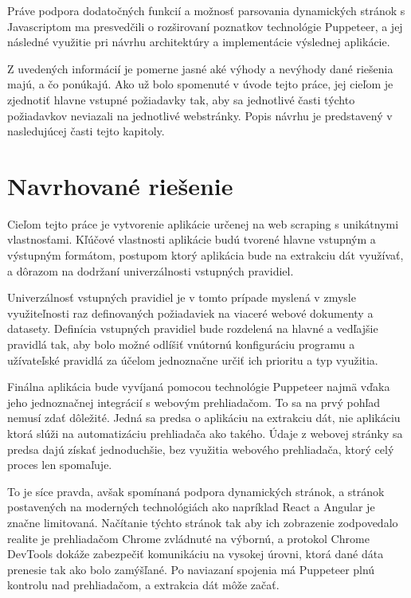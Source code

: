 Práve podpora dodatočných funkcií a možnosť parsovania dynamických stránok s Javascriptom ma presvedčili o rozširovaní poznatkov technológie Puppeteer, a jej následné využitie pri návrhu architektúry a implementácie výslednej aplikácie. 

\bigskip

Z uvedených informácií je pomerne jasné aké výhody a nevýhody dané riešenia majú, a čo ponúkajú. Ako už bolo spomenuté v úvode tejto práce, jej cieľom je zjednotiť hlavne vstupné požiadavky tak, aby sa jednotlivé časti týchto požiadavkov neviazali na jednotlivé webstránky. Popis návrhu je predstavený v nasledujúcej časti tejto kapitoly.

\newpage

\section{Navrhované riešenie}

Cieľom tejto práce je vytvorenie aplikácie určenej na web scraping s unikátnymi vlastnosťami. Kľúčové vlastnosti aplikácie budú tvorené hlavne vstupným a výstupným formátom, postupom ktorý aplikácia bude na extrakciu dát využívať, a dôrazom na dodržaní univerzálnosti vstupných pravidiel. 

Univerzálnosť vstupných pravidiel je v tomto prípade myslená v zmysle využiteľnosti raz definovaných požiadaviek na viaceré webové dokumenty a datasety. Definícia vstupných pravidiel bude rozdelená na hlavné a vedľajšie pravidlá tak, aby bolo možné odlíšiť vnútornú konfiguráciu programu a užívateľské pravidlá za účelom jednoznačne určiť ich prioritu a typ využitia.

Finálna aplikácia bude vyvíjaná pomocou technológie Puppeteer najmä vďaka jeho jednoznačnej integrácií s webovým prehliadačom. To sa na prvý pohľad nemusí zdať dôležité. Jedná sa predsa o aplikáciu na extrakciu dát, nie aplikáciu ktorá slúži na automatizáciu prehliadača ako takého. Údaje z webovej stránky sa predsa dajú získať jednoduchšie, bez využitia webového prehliadača, ktorý celý proces len spomaľuje. 

To je síce pravda, avšak spomínaná podpora dynamických stránok, a stránok postavených na moderných technológiách ako napríklad React a Angular je značne limitovaná. Načítanie týchto stránok tak aby ich zobrazenie zodpovedalo realite je prehliadačom Chrome zvládnuté na výbornú, a protokol Chrome DevTools dokáže zabezpečiť komunikáciu na vysokej úrovni, ktorá dané dáta prenesie tak ako bolo zamýšľané. Po naviazaní spojenia má Puppeteer plnú kontrolu nad prehliadačom, a extrakcia dát môže začať. 

